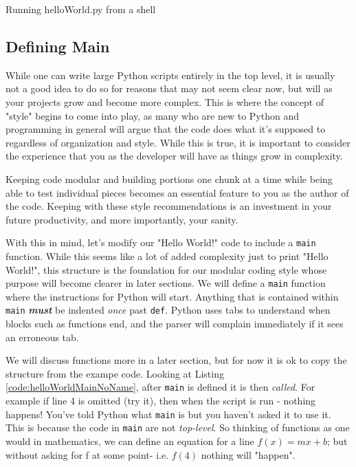 \documentclass{book}
\newcommand{\shell}[3]{
    \begin{listing}[htb]
        \begin{mdframed}[backgroundcolor=codebg]
              
        \end{mdframed}
        \caption{#2}
        \label{#3}
    \end{listing}
}
\begin{document}
\shell{../../../docCode/chapter1/helloWorld.txt}
      {Running helloWorld.py from a shell}
      {shell:helloWorld}

\subsection{Defining Main}

While one can write large Python scripts entirely in the top level, it is usually not a good idea to do so for reasons that may not seem clear now, but will as your projects grow and become more complex. This is where the concept of "style" begins to come into play, as many who are new to Python and programming in general will argue that the code does what it's supposed to regardless of organization and style. While this is true, it is important to consider the experience that you as the developer will have as things grow in complexity. 

Keeping code modular and building portions one chunk at a time while being able to test individual pieces becomes an essential feature to you as the author of the code. Keeping with these style recommendations is an investment in your future productivity, and more importantly, your sanity.

With this in mind, let's modify our "Hello World!" code to include a \texttt{main} function. While this seems like a lot of added complexity just to print "Hello World!", this structure is the foundation for our modular coding style whose purpose will become clearer in later sections. We will define a \texttt{main} function where the instructions for Python will start. Anything that is contained within \texttt{main} \textbf{\emph{must}} be indented \emph{once} past \texttt{def}. Python uses tabs to understand when blocks such as functions end, and the parser will complain immediately if it sees an erroneous tab.

We will discuss functions more in a later section, but for now it is ok to copy the structure from the exampe code. Looking at Listing \ref{code:helloWorldMainNoName}, after \texttt{main} is defined it is then \textit{called}. For example if line 4 is omitted (try it), then when the script is run - nothing happens! You've told Python what \texttt{main} is but you haven't asked it to use it. This is because the code in \texttt{main} are not \textit{top-level}. So thinking of functions as one would in mathematics, we can define an equation for a line $f(x)=mx+b$; but without asking for f at some point- i.e. $f(4)$ nothing will "happen". 
\end{document}
